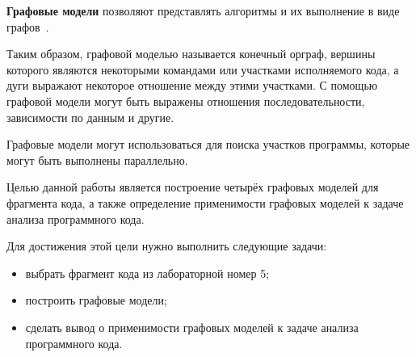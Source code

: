 
\textbf{Графовые модели} позволяют представлять алгоритмы и их выполнение в виде графов~\cite{lectures}.

Таким образом, графовой моделью называется конечный орграф, вершины которого являются некоторыми командами или участками исполняемого кода, а дуги выражают некоторое отношение между этими участками.
С помощью графовой модели могут быть выражены отношения последовательности, зависимости по данным и другие.

Графовые модели могут использоваться для поиска участков программы, которые могут быть выполнены параллельно.

Целью данной работы является построение четырёх графовых моделей для фрагмента кода, а также определение применимости графовых моделей к задаче анализа программного кода.

Для достижения этой цели нужно выполнить следующие задачи:
\begin{itemize}
  \item выбрать фрагмент кода из лабораторной номер 5;
  \item построить графовые модели;
  \item сделать вывод о применимости графовых моделей к задаче анализа программного кода.
\end{itemize}

\clearpage